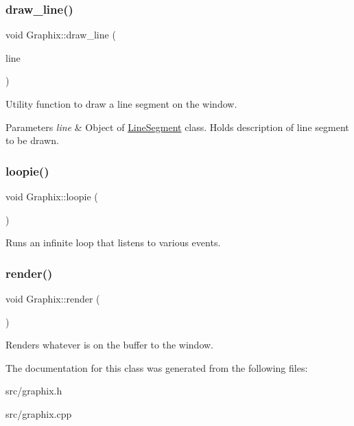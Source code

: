\subsubsection{\texorpdfstring{draw\+\_\+line()}{draw\_line()}}
{\footnotesize\ttfamily void Graphix\+::draw\+\_\+line (\begin{DoxyParamCaption}\item[{\hyperlink{classLineSegment}{Line\+Segment}}]{line }\end{DoxyParamCaption})}

Utility function to draw a line segment on the window. 
\begin{DoxyParams}{Parameters}
{\em line} & Object of \hyperlink{classLineSegment}{Line\+Segment} class. Holds description of line segment to be drawn. \\
\hline
\end{DoxyParams}
\mbox{\label{classGraphix_af7b539b3ab40274dc2f89d060cba0c51}} 
\subsubsection{\texorpdfstring{loopie()}{loopie()}}
{\footnotesize\ttfamily void Graphix\+::loopie (\begin{DoxyParamCaption}{ }\end{DoxyParamCaption})}

Runs an infinite loop that listens to various events. \mbox{\label{classGraphix_a3e24075d5ded3741a9c14a7978b721d8}} 
\subsubsection{\texorpdfstring{render()}{render()}}
{\footnotesize\ttfamily void Graphix\+::render (\begin{DoxyParamCaption}{ }\end{DoxyParamCaption})}

Renders whatever is on the buffer to the window. 

The documentation for this class was generated from the following files\+:\begin{DoxyCompactItemize}
\item 
src/graphix.\+h\item 
src/graphix.\+cpp\end{DoxyCompactItemize}

